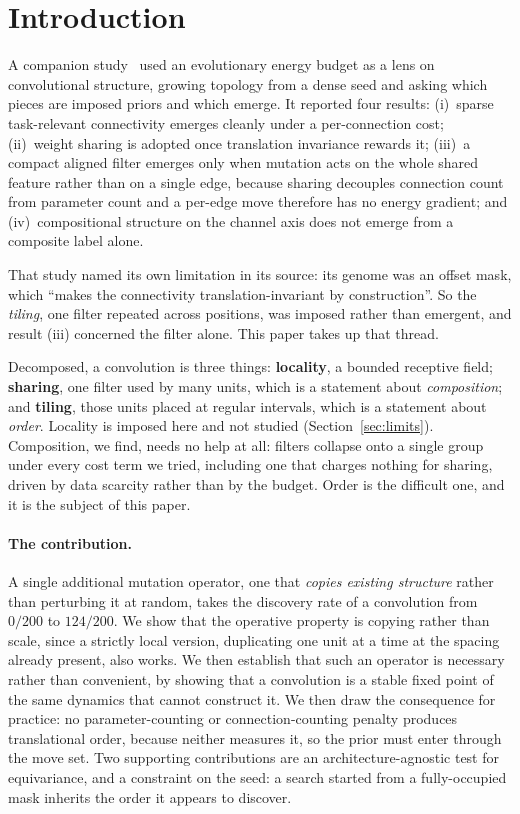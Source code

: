 \documentclass[11pt]{article}
\begin{document}
\section{Introduction}

A companion study~\cite{paper1} used an evolutionary energy budget as a lens on convolutional structure,
growing topology from a dense seed and asking which pieces are imposed priors and which emerge. It
reported four results: (i)~sparse task-relevant connectivity emerges cleanly under a per-connection cost;
(ii)~weight sharing is adopted once translation invariance rewards it; (iii)~a compact aligned filter
emerges only when mutation acts on the whole shared feature rather than on a single edge, because sharing
decouples connection count from parameter count and a per-edge move therefore has no energy gradient;
and (iv)~compositional structure on the channel axis does not emerge from a composite label alone.

That study named its own limitation in its source: its genome was an offset mask, which ``makes the
connectivity translation-invariant by construction''. So the \emph{tiling}, one filter repeated across
positions, was imposed rather than emergent, and result (iii) concerned the filter alone. This paper
takes up that thread.

Decomposed, a convolution is three things: \textbf{locality}, a bounded receptive field; \textbf{sharing},
one filter used by many units, which is a statement about \emph{composition}; and \textbf{tiling}, those
units placed at regular intervals, which is a statement about \emph{order}. Locality is imposed here and
not studied (Section~\ref{sec:limits}). Composition, we find, needs no help at all: filters collapse onto
a single group under every cost term we tried, including one that charges nothing for sharing, driven by
data scarcity rather than by the budget. Order is the difficult one, and it is the subject of this paper.

\paragraph{The contribution.} A single additional mutation operator, one that \emph{copies existing
structure} rather than perturbing it at random, takes the discovery rate of a convolution from $0/200$ to
$124/200$. We show that the operative property is copying rather than scale, since a strictly local
version, duplicating one unit at a time at the spacing already present, also works. We then establish
that such an operator is necessary rather than convenient, by showing that a convolution is a stable
fixed point of the same dynamics that cannot construct it. We then draw the consequence for practice: no
parameter-counting or connection-counting penalty produces translational order, because neither measures
it, so the prior must enter through the move set. Two supporting contributions are an
architecture-agnostic test for equivariance, and a constraint on the seed: a search started from a
fully-occupied mask inherits the order it appears to discover.
\end{document}
